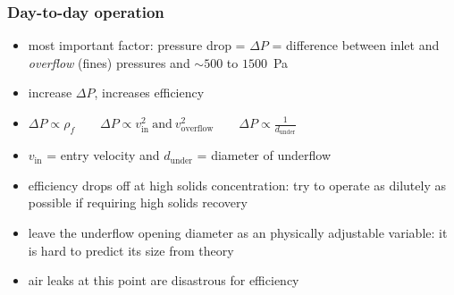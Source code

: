 \begin{frame}\frametitle{Day-to-day operation}
	\begin{itemize}
		\item	most important factor: pressure drop = $\Delta P$ = difference between inlet and \emph{overflow} (fines) pressures and $\sim 500$ to $1500$~Pa
		\item	increase $\Delta P$, increases efficiency %
		\item	$\Delta P \propto \rho_f \qquad  \Delta P \propto v_\text{in}^2~\text{and}~v_\text{overflow}^2 \qquad  \Delta P \propto \displaystyle\frac{1}{d_\text{under}}$
		\item	$v_\text{in}$ = entry velocity and $d_\text{under}$ = diameter of underflow
		\item	efficiency drops off at high solids concentration: try to operate as dilutely as possible if requiring high solids recovery
		\item	leave the underflow opening diameter as an physically adjustable variable: it is hard to predict its size from theory
		\item	air leaks at this point are disastrous for efficiency 
	\end{itemize}
\end{frame}

